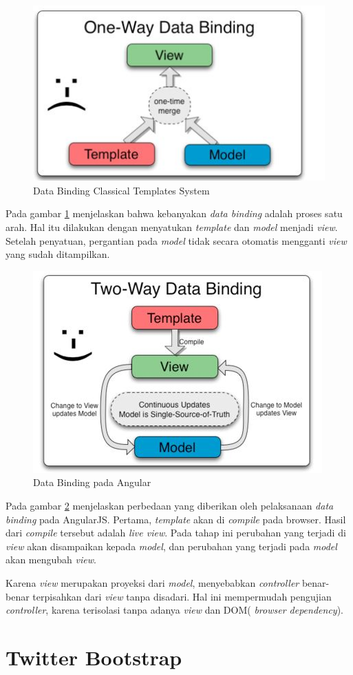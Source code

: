 		\begin{figure}[H]
			\centering
			\includegraphics[scale=0.75]{Gambar/Dabin1}
			\caption{Data Binding Classical Templates System}
			\label{fig:dabin1}
		\end{figure}
		Pada gambar \ref{fig:dabin1} menjelaskan bahwa kebanyakan \textit{data binding} adalah proses satu arah. Hal itu dilakukan dengan menyatukan \textit{template} dan \textit{model} menjadi \textit{view}. Setelah penyatuan, pergantian pada \textit{model} tidak secara otomatis mengganti \textit{view} yang sudah ditampilkan.
		\begin{figure}[H]
			\centering
			\includegraphics[scale=0.75]{Gambar/Dabin2}
			\caption{Data Binding pada Angular}
			\label{fig:dabin2}
		\end{figure}
		Pada gambar \ref{fig:dabin2} menjelaskan perbedaan yang diberikan oleh pelaksanaan \textit{data binding} pada AngularJS. Pertama, \textit{template} akan di \textit{compile} pada browser. Hasil dari \textit{compile} tersebut adalah \textit{live view}. Pada tahap ini perubahan yang terjadi di \textit{view} akan disampaikan kepada \textit{model}, dan perubahan yang terjadi pada \textit{model} akan mengubah \textit{view}.
		
		Karena \textit{view} merupakan proyeksi dari \textit{model}, menyebabkan \textit{controller} benar-benar terpisahkan dari \textit{view} tanpa disadari. Hal ini mempermudah pengujian \textit{controller}, karena terisolasi tanpa adanya \textit{view} dan DOM( \textit{browser dependency}).
		
		
\section{Twitter Bootstrap}
\label{sec: Bootrstrap}

		